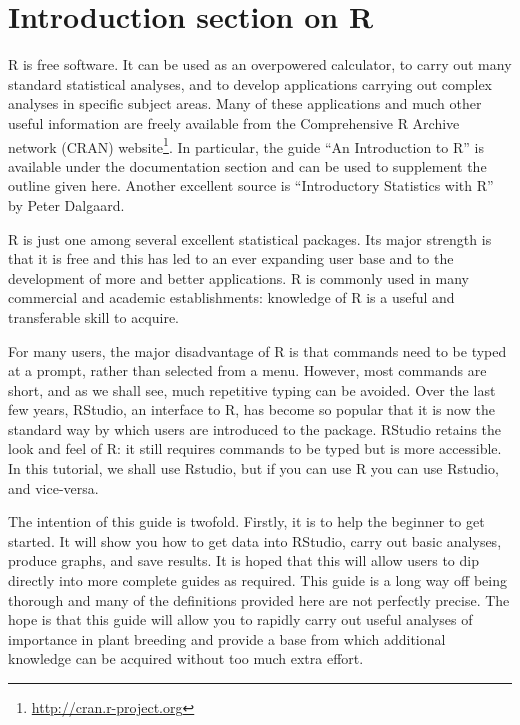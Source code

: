 \documentclass[
]{book}
\renewcommand{\href}[2]{#2\footnote{\url{#1}}}
\begin{document}
\hypertarget{introduction-section-on-r}{%
\section{Introduction section on R}\label{introduction-section-on-r}}

R is free software. It can be used as an overpowered calculator, to carry out many standard statistical analyses, and to develop applications carrying out complex analyses in specific subject areas. Many of these applications and much other useful information are freely available from the Comprehensive R Archive network (CRAN) \href{http://cran.r-project.org}{website}. In particular, the guide ``An Introduction to R'' is available under the documentation section and can be used to supplement the outline given here. Another excellent source is ``Introductory Statistics with R'' by Peter Dalgaard.

R is just one among several excellent statistical packages. Its major strength is that it is free and this has led to an ever expanding user base and to the development of more and better applications. R is commonly used in many commercial and academic establishments: knowledge of R is a useful and transferable skill to acquire.

For many users, the major disadvantage of R is that commands need to be typed at a prompt, rather than selected from a menu. However, most commands are short, and as we shall see, much repetitive typing can be avoided. Over the last few years, RStudio, an interface to R, has become so popular that it is now the standard way by which users are introduced to the package. RStudio retains the look and feel of R: it still requires commands to be typed but is more accessible. In this tutorial, we shall use Rstudio, but if you can use R you can use Rstudio, and vice-versa.

The intention of this guide is twofold. Firstly, it is to help the beginner to get started. It will show you how to get data into RStudio, carry out basic analyses, produce graphs, and save results. It is hoped that this will allow users to dip directly into more complete guides as required. This guide is a long way off being thorough and many of the definitions provided here are not perfectly precise. The hope is that this guide will allow you to rapidly carry out useful analyses of importance in plant breeding and provide a base from which additional knowledge can be acquired without too much extra effort.
\end{document}
